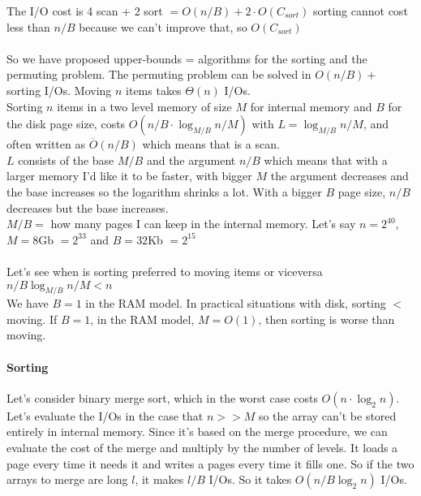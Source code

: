 \documentclass[10pt]{report}
\begin{document}
The I/O cost is 4 scan + 2 sort $= O(n/B) + 2\cdot O(C_{sort})$ sorting cannot cost less than $n/B$ because we can't improve that, so $O(C_{sort})$\\\\
So we have proposed upper-bounds = algorithms for the sorting and the permuting problem. The permuting problem can be solved in $O(n/B) +$ sorting I/Os. Moving $n$ items takes $\Theta(n)$ I/Os.\\
Sorting $n$ items in a two level memory of size $M$ for internal memory and $B$ for the disk page size, costs $O(n/B \cdot \log_{M/B} n/M)$ with $L = \log_{M/B} n/M$, and often written as $\overline{O}(n/B)$ which means that is a scan.\\
$L$ consists of the base $M/B$ and the argument $n/B$ which means that with a larger memory I'd like it to be faster, with bigger $M$ the argument decreases and the base increases so the logarithm shrinks a lot. With a bigger $B$ page size, $n/B$ decreases but the base increases.\\
$M/B =$ how many pages I can keep in the internal memory. Let's say $n = 2^{40}$, $M = 8$Gb $= 2^{33}$ and $B = 32$Kb $= 2^{15}$\\\\ %
Let's see when is sorting preferred to moving items or viceversa\\
$n/B \log_{M/B} n/M < n$\\ %
We have $B = 1$ in the RAM model. In practical situations with disk, sorting $<$ moving. If $B = 1$, in the RAM model, $M = O(1)$, then sorting is worse than moving.
\paragraph{Sorting} Let's consider binary merge sort, which in the worst case costs $O(n\cdot \log_2 n)$. Let's evaluate the I/Os in the case that $n >> M$ so the array can't be stored entirely in internal memory. Since it's based on the merge procedure, we can evaluate the cost of the merge and multiply by the number of levels. It loads a page every time it needs it and writes a pages every time it fills one. So if the two arrays to merge are long $l$, it makes $l/B$ I/Os. So it takes $O(n/B \log_2 n)$ I/Os.
\end{document}
